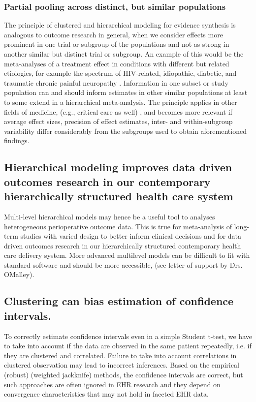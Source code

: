 \documentclass[11pt,notitlepage]{article}
\begin{document}
\subsubsection*{Partial pooling across distinct, but similar populations}
The principle  of clustered and hierarchical modeling for evidence synthesis is analogous to outcome research in general, when we consider effects more prominent in one trial or subgroup of the populations and not as strong in another similar but distinct trial or subgroup. An example of this would be the meta-analyses of a treatment effect in conditions with different but related etiologies, for example the spectrum of HIV-related, idiopathic, diabetic, and traumatic chronic painful neuropathy \cite{Andreae2015}. Information in one subset or study population can and should inform estimates in other similar populations at least to some extend in a hierarchical meta-analysis. The principle applies in other fields of medicine, (e.g., critical care as well) \cite{Roth2015CriticalCare}, and becomes more relevant if average effect sizes, precision of effect estimates, inter- and within-subgroup variability differ considerably from the subgroups used to obtain aforementioned findings.

\subsection*{Hierarchical modeling improves data driven outcomes research in our contemporary hierarchically structured health care system}
 
Multi-level hierarchical models may hence be a useful tool to analyses heterogeneous perioperative outcome data. This is true for meta-analysis of long-term studies with varied design to better inform clinical decisions\cite{AndreaeJohnsonAbstract2013,Spiegelhalter2004bayesian} and for data driven outcomes research  in our hierarchically structured contemporary health care delivery system. More advanced multilevel models can be difficult to fit with standard software and should be more accessible, (see letter of support by Drs. OMalley).

\subsection*{Clustering can bias estimation of confidence intervals.} To correctly estimate confidence intervals even in a simple Student t-test, we have to take into account if the data are observed in the same patient repeatedly, i.e. if they are clustered and correlated. Failure to take into account correlations in clustered observation may lead to incorrect inferences. Based on the empirical (robust) (weighted jackknife) methods, the confidence intervals are correct, but such approaches are often ignored in EHR research and they depend on convergence characteristics that may not hold in faceted EHR data. 
\end{document}
